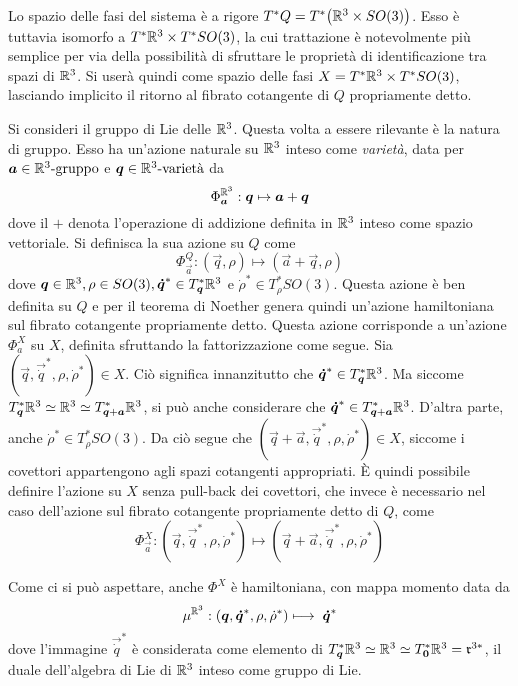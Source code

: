 Lo spazio delle fasi del sistema è a rigore $T^*Q = T^*\big(\mathbb{R}^3 \times SO(3)\big)$. Esso è tuttavia isomorfo a $T^*\mathbb{R}^3 \times T^*SO(3)$, la cui trattazione è notevolmente più semplice per via della possibilità di sfruttare le proprietà di identificazione tra spazi di $\mathbb{R}^3$. Si userà quindi come spazio delle fasi $X = T^*\mathbb{R}^3 \times T^*SO(3)$, lasciando implicito il ritorno al fibrato cotangente di $Q$ propriamente detto.

Si consideri il gruppo di Lie delle  $\mathbb{R}^3$. Questa volta a essere rilevante è la natura di gruppo. Esso ha un'azione naturale su $\mathbb{R}^3$ inteso come \emph{varietà}, data per $\boldsymbol{a} \in \mathbb{R}^3\text{-gruppo}$ e $\boldsymbol{q} \in \mathbb{R}^3\text{-varietà}$ da
\begin{equation*}
\Phi_{\boldsymbol{a}}^{\mathbb{R}^3}: \boldsymbol{q} \mapsto  \boldsymbol{a} + \boldsymbol{q}
\end{equation*}
dove il $+$ denota l'operazione di addizione definita in $\mathbb{R}^3$ inteso come spazio vettoriale. Si definisca la sua azione su $Q$ come 
\begin{equation*}
  \Phi_{\vec{a}}^Q: (\vec{q},\rho) \longmapsto (\vec{a} + \vec{q},\rho)
\end{equation*}
dove $\boldsymbol{q} \in \mathbb{R}^3, \rho \in SO(3), \boldsymbol{\dot{q}}^* \in T^*_{\boldsymbol{q}}\mathbb{R}^3$ e $\dot{\rho}^* \in T^*_{\rho}SO(3)$. Questa azione è ben definita su $Q$ e per il teorema di Noether genera quindi un'azione hamiltoniana sul fibrato cotangente propriamente detto. Questa azione corrisponde a un'azione $\Phi^X_a$ su $X$, definita sfruttando la fattorizzazione come segue. Sia $(\vec{q},\vec{\dot{q}}^*, \rho, \dot{\rho}^*) \in X$. Ciò significa innanzitutto che $\boldsymbol{\dot{q}}^* \in T^*_{\boldsymbol{q}}\mathbb{R}^3$. Ma siccome $T^*_{\boldsymbol{q}}\mathbb{R}^3 \simeq \mathbb{R}^3 \simeq T^*_{\boldsymbol{q}+\boldsymbol{a}}\mathbb{R}^3$, si può anche considerare che $\boldsymbol{\dot{q}}^* \in T^*_{\boldsymbol{q}+\boldsymbol{a}}\mathbb{R}^3$. D'altra parte, anche $\dot{\rho}^* \in  T^*_{\rho}SO(3)$. Da ciò segue che $(\vec{q} +\vec{a},\vec{\dot{q}}^*, \rho, \dot{\rho}^*) \in X$, siccome i covettori appartengono agli spazi cotangenti appropriati. È quindi possibile definire l'azione su $X$ senza pull-back dei covettori, che invece è necessario nel caso dell'azione sul fibrato cotangente propriamente detto di $Q$, come 
\begin{equation*}
\Phi^X_{\vec{a}}: (\vec{q},\vec{\dot{q}}^*, \rho, \dot{\rho}^*) \longmapsto (\vec{q}+ \vec{a},\vec{\dot{q}}^*, \rho, \dot{\rho}^*) 
\end{equation*}  

Come ci si può aspettare, anche $\Phi^X$ è hamiltoniana, con mappa momento data da
\begin{equation*}
\mu^{\mathbb{R}^3}: (\boldsymbol{q}, \boldsymbol{\dot{q}}^*, \rho, \dot{\rho}^*) \longmapsto\; \boldsymbol{\dot{q}}^*
\end{equation*} 
dove l'immagine $\vec{\dot{q}}^*$ è considerata come elemento di $T^*_{\boldsymbol{q}}\mathbb{R}^3 \simeq \mathbb{R}^3 \simeq T^*_{\boldsymbol{0}}\mathbb{R}^3 = \mathfrak{r}^{3*}$, il duale dell'algebra di Lie di $\mathbb{R}^3$ inteso come gruppo di Lie.

